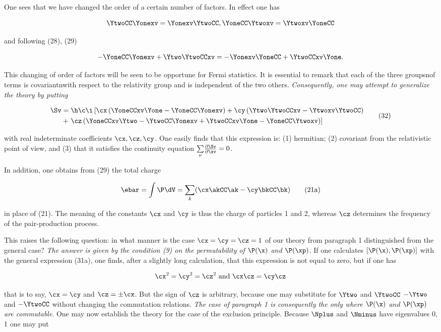 \documentclass{article}
\newcommand{\pdXdY}[2]{
\frac{\partial {#1}}{\partial {#2}}
}
\newcommand{\commutator}[2]{\left[ #1, #2 \right]}
\renewcommand{\it}[1]{\textit{#1}}
\newcommand{\sumk}{\underset{k}{\sum}}
\newcommand{\sumX}[1]{\underset{#1}{\sum}}
\newcommand{\nequ}[2]{
\begin{equation*}
#1
\tag{#2}
\end{equation*}
}
\newcommand{\uequ}[1]{
\begin{equation*}
#1
\end{equation*}
}
\begin{document}
One sees that we have changed the order of a certain number of factors. In effect one has

\uequ{
\YtwoCC\Yonexv = \Yonexv\YtwoCC, \YoneCC\Ytwoxv = \Ytwoxv\YoneCC
}

and following (28), (29)

\uequ{
-\YoneCC\Yonexv + \Ytwo\YtwoCCxv = -\Yonexv\YoneCC + \YtwoCCxv\Yone.
}

This changing of order of factors will be seen to be opportune for Fermi statistics.
It is essential to remark that each of the three groupsnof terms is covariantnwith respect to the relativity group and is independent of the two others. \it{Consequently, one may attempt to generalize the theory by putting}

\nequ{
\begin{split}
\Sv &= \h\c\i\left[
\cx\left(\YoneCCxv\Yone - \YoneCC\Yonexv\right)
+ \cy\left( \Ytwo\YtwoCCxv - \Ytwoxv\YtwoCC\right) \right. \\
&+ \left. \cz\left( \YoneCCxv\Ytwo - \YtwoCC\Yonexv + \YtwoCCxv\Yone - \YoneCC\Ytwoxv\right)
\right]
\end{split}
}{32}

with real indeterminate coefficients $\cx, \cz, \cy$. One easily finds that this expression is: (1) hermitian; (2) covariant from the relativistic point of view, and (3) that it satisfies the continuity equation $\sumX{\nu}\pdXdY{\Sv}{\xv} = 0$.

In addition, one obtains from (29) the total charge

\nequ{
\ebar = \int\P\dV = \sumk(\cx\akCC\ak - \cy\bkCC\bk)
}{21a}

in place of (21). The meaning of the constants $\cx$ and $\cy$ is thus the charge of particles 1 and 2, whereas $\cz$ determines the frequency of the pair-production process.

This raises the following question: in what manner is the case $\cx = \cy = \cz = 1$ of our theory from paragraph 1 distinguished from the general case? \it{The answer is given by the condition (9) on the permutability of $\P(\x)$ and $\P(\xp)$}. If one calculates $\commutator{\P(\x)}{\P(\xp)}$ with the general expression (31a), one finds, after a slightly long calculation, that this expression is not equal to zero, but if one has

\uequ{
\cx^2 = \cy^2 = \cz^2 \text{ and } \cx\cz = \cy\cz
}

that is to say, $\cx = \cy$ and $\cz = \pm\cx$. But the sign of $\cz$ is arbitrary, because one may substitute for $\Ytwo$ and $\YtwoCC$ $-\Ytwo$ and $-\YtwoCC$ without changing the commutation relations. \it{The case of paragraph 1 is consequently the only where $\P(\x)$ and $\P(\xp)$ are commutable}.
One may now establish the theory for the case of the exclusion principle. Because $\Nplus$ and $\Nminus$ have eigenvalues 0, 1 one may put
\end{document}

